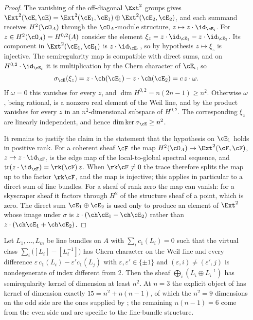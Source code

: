 \begin{proof}
The vanishing of the off-diagonal $\Ext^{2}$ groups gives
$\Ext^{2}(\cE,\cE)=\Ext^{2}(\cE_{1},\cE_{1})\oplus\Ext^{2}(\cE_{2},\cE_{2})$,
and each summand receives $H^{2}(\cO_{A})$ through the $\cO_{A}$-module
structure, $z\mapsto z\cdot\id_{\cE_{i}}$. For $z\in H^{2}(\cO_{A})=H^{0,2}(A)$
consider the element $\xi_{z}=z\cdot\id_{\cE_{1}}-z\cdot\id_{\cE_{2}}$. Its
component in $\Ext^{2}(\cE_{1},\cE_{1})$ is $z\cdot\id_{\cE_{1}}$, so by
hypothesis $z\mapsto\xi_{z}$ is injective. The semiregularity map is
compatible with direct sums, and on $H^{0,2}\cdot\id_{\cE_{i}}$ it is
multiplication by the Chern character of $\cE_{i}$, so
\[
  \sigma_{\cE}(\xi_{z})=z\cdot\ch(\cE_{1})-z\cdot\ch(\cE_{2})
  =c\,z\cdot\omega .
\]
If $\omega=0$ this vanishes for every $z$, and
$\dim H^{0,2}=n(2n-1)\ge n^{2}$. Otherwise $\omega$, being rational, is a
nonzero real element of the Weil line, and by  the
product vanishes for every $z$ in an $n^{2}$-dimensional subspace of
$H^{0,2}$. The corresponding $\xi_{z}$ are linearly independent, and hence
$\dim\ker\sigma_{\cE}\ge n^{2}$.

It remains to justify the claim in the statement that the hypothesis on
$\cE_{1}$ holds in positive rank. For a coherent sheaf $\cF$ the map
$H^{2}(\cO_{A})\to\Ext^{2}(\cF,\cF)$, $z\mapsto z\cdot\id_{\cF}$, is the edge
map of the local-to-global spectral sequence, and
$\operatorname{tr}(z\cdot\id_{\cF})=\rk(\cF)\,z$. When $\rk\cF\ne0$ the trace
therefore splits the map up to the factor $\rk\cF$, and the map is
injective; this applies in particular to a direct sum of line bundles. For a
sheaf of rank zero the map can vanish: for a skyscraper sheaf it factors
through $H^{2}$ of the structure sheaf of a point, which is zero. The direct
sum $\cE_{1}\oplus\cE_{2}$ is used only to produce an element of $\Ext^{2}$
whose image under $\sigma$ is $z\cdot(\ch\cE_{1}-\ch\cE_{2})$ rather than
$z\cdot(\ch\cE_{1}+\ch\cE_{2})$.
\end{proof}

\begin{corollary}
\label{cor:pteobstructed}
Let $L_{1},\dots,L_{m}$ be line bundles on $A$ with
$\sum_{i}c_{1}(L_{i})=0$ such that the virtual class
$\sum_{i}\bigl([L_{i}]-[L_{i}^{-1}]\bigr)$ has Chern character on the Weil
line and every difference
$\varepsilon\,c_{1}(L_{i})-\varepsilon'c_{1}(L_{j})$ with
$\varepsilon,\varepsilon'\in\{\pm1\}$ and $(\varepsilon,i)\ne(\varepsilon',j)$
is nondegenerate of index different from $2$. Then the sheaf
$\bigoplus_{i}(L_{i}\oplus L_{i}^{-1})$ has semiregularity kernel of
dimension at least $n^{2}$. At $n=3$ the explicit object of
 has kernel of dimension exactly
$15=n^{2}+n(n-1)$, of which the $n^{2}=9$ dimensions on the odd side are
the ones supplied by ; the remaining $n(n-1)=6$ come from
the even side and are specific to the line-bundle structure.
\end{corollary}

